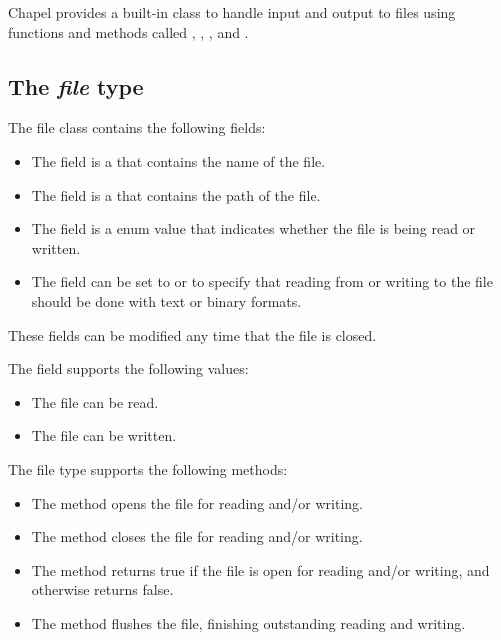 \label{Input_and_Output}

Chapel provides a built-in  class to handle input and
output to files using functions and methods
called , ,
, and .

\subsection{The {\em file} type}

The file class contains the following fields:
\begin{itemize}
\item
The  field is a  that contains the name of
the file.
\item
The  field is a  that contains the path of the
file.
\item
The  field is a  enum value that indicates
whether the file is being read or written.
\item
The  field can be set to  or  to
specify that reading from or writing to the file should be done with
text or binary formats.
\end{itemize}
These fields can be modified any time that the file is closed.

The  field supports the following  values:
\begin{itemize}
\item
{} The file can be read.
\item
{} The file can be written.
\end{itemize}

The file type supports the following methods:
\begin{itemize}
\item
The  method opens the file for reading and/or writing.
\item
The  method closes the file for reading and/or writing.
\item
The  method returns true if the file is open for reading
and/or writing, and otherwise returns false.
\item
The  method flushes the file, finishing outstanding
reading and writing.
\end{itemize}

